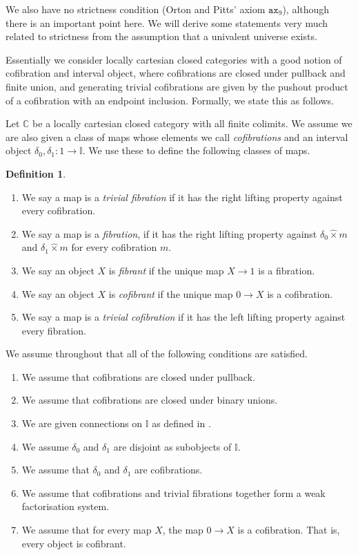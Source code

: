 \documentclass[a4paper]{amsart}
\theoremstyle{definition}
\newtheorem{definition}[theorem]{Definition}
\newcommand{\cat}[1]{\mathbb{#1}}
\newcommand{\catc}{\cat{C}}
\newcommand{\intv}{\mathbb{I}}
\begin{document}
We also have no strictness condition (Orton and Pitts' axiom
$\mathtt{ax}_9$), although there is an important point here. We will
derive some statements very much related to strictness from the
assumption that a univalent universe exists.

Essentially we consider locally cartesian closed categories with a
good notion of cofibration and interval object, where cofibrations are
closed under pullback and finite union, and generating trivial
cofibrations are given by the pushout product of a cofibration with an
endpoint inclusion. Formally, we state this as
follows.

Let $\catc$ be a locally cartesian closed category with all finite
colimits. We assume we are also given a class of maps whose elements
we call \emph{cofibrations} and an interval object
$\delta_0, \delta_1 \colon 1 \to \intv$. We use these to define the
following classes of maps.
\begin{definition}
  \begin{enumerate}
  \item We say a map is a \emph{trivial fibration} if it has the right
    lifting property against every cofibration.
  \item We say a map is a \emph{fibration}, if it has the right
    lifting property against $\delta_0 \hat{\times} m$ and $\delta_1
    \hat{\times} m$ for every cofibration $m$.
  \item We say an object $X$ is \emph{fibrant} if the unique map $X
    \to 1$ is a fibration.
  \item We say an object $X$ is \emph{cofibrant} if the unique map $0
    \to X$ is a cofibration.
  \item We say a map is a \emph{trivial cofibration} if it has the
    left lifting property against every fibration.
  \end{enumerate}
\end{definition}

We assume throughout that all of the following conditions are
satisfied.
\begin{enumerate}
\item We assume that cofibrations are closed under pullback.
\item We assume that cofibrations are closed under binary unions.
\item We are given connections on $\intv$ as defined in
  \cite{vdbergfrumin}.
\item We assume $\delta_0$ and $\delta_1$ are disjoint as subobjects
  of $\intv$.
\item We assume that $\delta_0$ and $\delta_1$ are cofibrations.
\item We assume that cofibrations and trivial fibrations together form
  a weak factorisation system.
\item We assume that for every map $X$, the map $0 \to X$ is a
  cofibration. That is, every object is cofibrant.
\end{enumerate}
\end{document}
